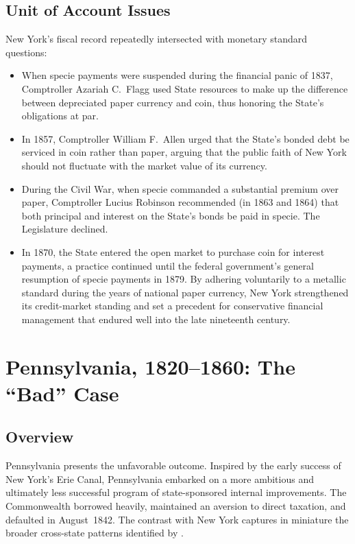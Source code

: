 \documentclass[11pt]{article}
\begin{document}
\subsection{Unit of Account Issues}

New York's fiscal record repeatedly intersected with monetary standard
questions:

\begin{itemize}
\item When specie payments were suspended during the financial panic of 1837,
  Comptroller Azariah C.\ Flagg used State resources to make up the difference
  between depreciated paper currency and coin, thus honoring the State's
  obligations at par.

\item In 1857, Comptroller William F.\ Allen urged that the State's bonded debt
  be serviced in coin rather than paper, arguing that the public faith of New
  York should not fluctuate with the market value of its currency.

\item During the Civil War, when specie commanded a substantial premium over
  paper, Comptroller Lucius Robinson recommended (in 1863 and 1864) that both
  principal and interest on the State's bonds be paid in specie.  The
  Legislature declined.

\item In 1870, the State entered the open market to purchase coin for interest
  payments, a practice continued until the federal government's general
  resumption of specie payments in 1879.  By adhering voluntarily to a
  metallic standard during the years of national paper currency, New York
  strengthened its credit-market standing and set a precedent for conservative
  financial management that endured well into the late nineteenth century.
\end{itemize}

\section{Pennsylvania, 1820--1860: The ``Bad'' Case}
\label{sec:pennsylvania}

\subsection{Overview}

Pennsylvania presents the unfavorable outcome.  Inspired by the early success
of New York's Erie Canal, Pennsylvania embarked on a more ambitious and
ultimately less successful program of state-sponsored internal improvements.
The Commonwealth borrowed heavily, maintained an aversion to direct taxation,
and defaulted in August~1842.  The contrast with New York captures in
miniature the broader cross-state patterns identified by \citet{wallis2005constitutions}.
\end{document}
